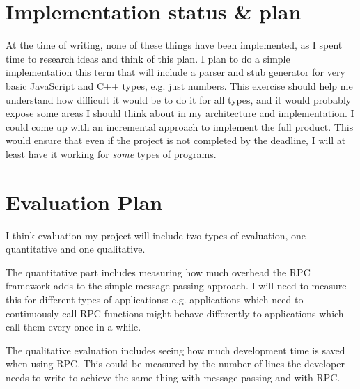 \section{Implementation status \& plan}
At the time of writing, none of these things have been implemented, as I spent time to research ideas and think of this plan. I plan to do a simple implementation this term that will include a parser and stub generator for very basic JavaScript and C++ types, e.g. just numbers. This exercise should help me understand how difficult it would be to do it for all types, and it would probably expose some areas I should think about in my architecture and implementation. I could come up with an incremental approach to implement the full product. This would ensure that even if the project is not completed by the deadline, I will at least have it working for \emph{some} types of programs.

\section{Evaluation Plan}
I think evaluation my project will include two types of evaluation, one quantitative and one qualitative.

The quantitative part includes measuring how much overhead the RPC framework adds to the simple message passing approach. I will need to measure this for different types of applications: e.g. applications which need to continuously call RPC functions might behave differently to applications which call them every once in a while.

The qualitative evaluation includes seeing how much development time is saved when using RPC. This could be measured by the number of lines the developer needs to write to achieve the same thing with message passing and with RPC.